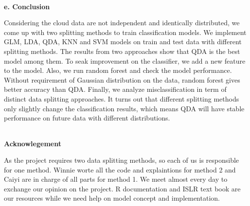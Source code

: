 \documentclass[11pt]{article}
\begin{document}
\vspace{0.3cm}
\mbox{}\\
\textbf{e. Conclusion}

Considering the cloud data are not independent and identically distributed, we come up with two splitting methods to train classification models. We implement GLM, LDA, QDA, KNN and SVM models on train and test data with different splitting methods. The results from two approaches show that QDA is the best model among them. To seak improvement on the classifier, we add a new feature to the model. Also, we run random forest and check the model performance. Without requirement of Gaussian distribution on the data, random forest gives better accuracy than QDA. Finally, we analyze misclassification in term of distinct data splitting approaches. It turns out that different splitting methods only slightly change the classification results, which means QDA will have stable performance on future data with different
distributions. 

\vspace{0.3cm}
\mbox{}\\
\textbf{Acknowlegement}

As the project requires two data splitting methods, so each of us is responsible for one method. Winnie worte all the code and explaintions for method 2 and Caiyi are in charge of all parts for method 1. We meet almost every day to exchange our opinion on the project. R documentation and ISLR text book are our resources while we need help on model concept and implementation. 
\end{document}
